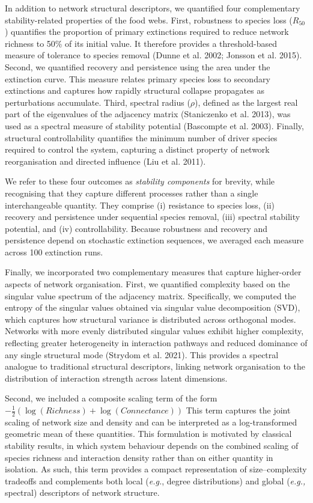 \documentclass[
]{article}
\begin{document}
In addition to network structural descriptors, we quantified four
complementary stability-related properties of the food webs. First,
robustness to species loss (\(R_{50}\)) quantifies the proportion of
primary extinctions required to reduce network richness to 50\% of its
initial value. It therefore provides a threshold-based measure of
tolerance to species removal (Dunne et al. 2002; Jonsson et al. 2015).
Second, we quantified recovery and persistence using the area under the
extinction curve. This measure relates primary species loss to secondary
extinctions and captures how rapidly structural collapse propagates as
perturbations accumulate. Third, spectral radius (\(\rho\)), defined as
the largest real part of the eigenvalues of the adjacency matrix
(Staniczenko et al. 2013), was used as a spectral measure of stability
potential (Bascompte et al. 2003). Finally, structural controllability
quantifies the minimum number of driver species required to control the
system, capturing a distinct property of network reorganisation and
directed influence (Liu et al. 2011).

We refer to these four outcomes as \emph{stability components} for
brevity, while recognising that they capture different processes rather
than a single interchangeable quantity. They comprise (i) resistance to
species loss, (ii) recovery and persistence under sequential species
removal, (iii) spectral stability potential, and (iv) controllability.
Because robustness and recovery and persistence depend on stochastic
extinction sequences, we averaged each measure across 100 extinction
runs.

Finally, we incorporated two complementary measures that capture
higher-order aspects of network organisation. First, we quantified
complexity based on the singular value spectrum of the adjacency matrix.
Specifically, we computed the entropy of the singular values obtained
via singular value decomposition (SVD), which captures how structural
variance is distributed across orthogonal modes. Networks with more
evenly distributed singular values exhibit higher complexity, reflecting
greater heterogeneity in interaction pathways and reduced dominance of
any single structural mode (Strydom et al. 2021). This provides a
spectral analogue to traditional structural descriptors, linking network
organisation to the distribution of interaction strength across latent
dimensions.

Second, we included a composite scaling term of the form
\(-\frac{1}{2}(\log{(Richness)} + \log{(Connectance)})\) This term
captures the joint scaling of network size and density and can be
interpreted as a log-transformed geometric mean of these quantities.
This formulation is motivated by classical stability results, in which
system behaviour depends on the combined scaling of species richness and
interaction density rather than on either quantity in isolation. As
such, this term provides a compact representation of size--complexity
tradeoffs and complements both local (\emph{e.g.}, degree distributions)
and global (\emph{e.g.,} spectral) descriptors of network structure.
\end{document}
